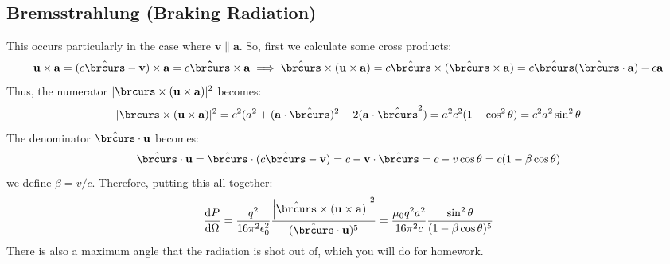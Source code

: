 \subsection{Bremsstrahlung (Braking Radiation)}
This occurs particularly in the case where \( \mathbf{v} \parallel \mathbf{a} \). So, first we calculate some
cross products:
\[
	\mathbf{u} \times \mathbf{a} = (c \hat{\brcurs} - \mathbf{v}) \times \mathbf{a} = c
	\mathbf{\hat{\brcurs}} \times \mathbf{a} \implies \hat{\brcurs} \times (\mathbf{u} \times \mathbf{a}) = c
	\hat{\brcurs} \times (\hat{\brcurs} \times \mathbf{a}) = c \hat{\brcurs} (\hat{\brcurs} \cdot \mathbf{a})
	- c \mathbf{a}
\]
Thus, the numerator \( |\brcurs \times (\mathbf{u} \times \mathbf{a})|^2 \) becomes:
\[
	 |\brcurs \times (\mathbf{u} \times \mathbf{a})|^2 = c^2(a^2 + (\mathbf{a} \cdot \hat{\brcurs})^2 -
	 2(\mathbf{a} \cdot \hat{\brcurs}^2) = a^2 c^2 (1 - \cos^2 \theta) = c^2 a^2 \sin^2 \theta
\]
The denominator \( \hat{\brcurs} \cdot \mathbf{u} \) becomes:
\[
	\hat{\brcurs} \cdot \mathbf{u} = \hat{\brcurs} \cdot (c \hat{\brcurs} - \mathbf{v}) = c - \mathbf{v}
	\cdot \hat{\brcurs} = c - v \cos \theta = c(1 - \beta \cos \theta)
\]
we define \( \beta = v / c \). Therefore, putting this all together:
\[
	\dv{P}{\Omega} = \frac{q^2}{16 \pi^2 \epsilon_0^2} \frac{\left| \hat{\brcurs} \times(\mathbf{u} \times
	\mathbf{a}) \right|^2}{(\hat{\brcurs} \cdot \mathbf{u})^{5}} = \frac{\mu_0 q^2 a^2}{16 \pi^2 c}
	\frac{\sin^2 \theta}{(1 - \beta \cos \theta)^{5}}
\]
There is also a maximum angle that the radiation is shot out of, which you will do for homework. 
